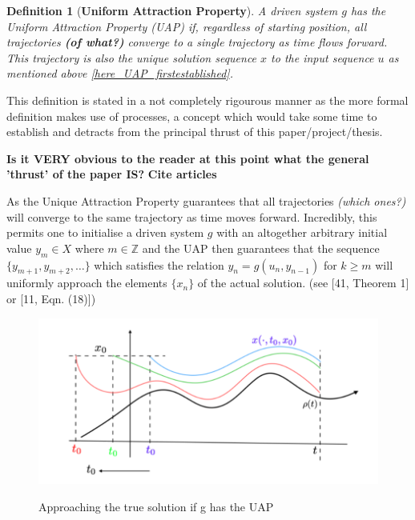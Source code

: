 \documentclass[12 pt]{article}
\newtheorem{Definition}{Definition}[]
\begin{document}
\begin{Definition}
  [\bf Uniform Attraction Property]\label{Dfn_UAP}
  A driven system $g$ has the Uniform Attraction Property (UAP) if, regardless of starting position, all trajectories \textbf{(of what?)} converge to a single trajectory as time flows forward. 
  This trajectory is also the unique solution sequence $x$ to the input sequence $u$ as mentioned above \ref{here_UAP_firstestablished}.
\end{Definition}

This definition is stated in a not completely rigourous manner as the more formal definition makes use of processes, a concept which would take some time to establish and detracts from the principal thrust of this paper/project/thesis. 

\textbf{Is it VERY obvious to the reader at this point what the general 'thrust' of the paper IS?} \textbf{Cite articles}

As the Unique Attraction Property guarantees that all trajectories \textit{(which ones?)} will converge to the same trajectory as time moves forward. 
Incredibly, this permits one to initialise a driven system $g$ with an altogether arbitrary initial value $y_m\in{X}$ where $m\in\mathbb{Z}$ and the UAP then guarantees that the sequence $\{y_{m+1}, y_{m+2},\ldots\}$ which satisfies the relation $y_n=g(u_n, y_{n-1})$  for  $k\geq{m}$  will uniformly approach the elements $\{x_n\}$ of the actual solution. (see [41, Theorem 1] or [11, Eqn. (18)]) 
 

\begin{figure}[ht]
  \includegraphics[scale=0.4]{memloss_conttime.png}
  \centering
  \label{fig:memoryLosscont_time}
\caption{Approaching the true solution if g has the UAP}
\end{figure}
\end{document}
